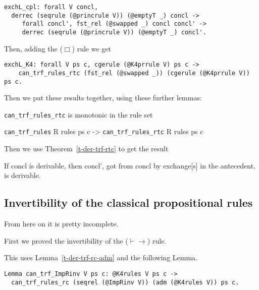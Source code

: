 \documentclass[a4paper,12pt]{llncs}
\begin{document}
\begin{verbatim}
exchL_cpl: forall V concl,
  derrec (seqrule (@princrule V)) (@emptyT _) concl ->
     forall concl', fst_rel (@swapped _) concl concl' ->
     derrec (seqrule (@princrule V)) (@emptyT _) concl'.
\end{verbatim}

Then, adding the ($\Box$) rule we get

\begin{verbatim}
exchL_K4: forall V ps c, cgerule (@K4prrule V) ps c ->
    can_trf_rules_rtc (fst_rel (@swapped _)) (cgerule (@K4prrule V)) ps c.
\end{verbatim}

Then we put these results together, using these further lemmas: 
\begin{lemma}\label{l-can-trf-rules-rtc}
\texttt{can\_trf\_rules\_rtc} is monotonic in the rule set
\end{lemma}
\begin{lemma}\label{l-can-trf-rules-imp-rtc}
\texttt{can\_trf\_rules} R rules ps c ->
  \texttt{can\_trf\_rules\_rtc} R rules ps c
\end{lemma}

Then we use Theorem~\ref{t-der-trf-rtc} to get the result

\begin{theorem}\label{t-exchL}
If concl is derivable, then concl', got from concl by exchange[s] in the
antecedent, is derivable.
\end{theorem}

\subsection{Invertibility of the classical propositional rules}

From here on it is pretty incomplete.

First we proved the invertibility of the ($\vdash\to$) rule.

This uses Lemma~\ref{t-der-trf-rc-adm} and the following Lemma.

\begin{lemma}\label{t-can-trf-ImpRinv}
\end{lemma}

\begin{verbatim}
Lemma can_trf_ImpRinv V ps c: @K4rules V ps c ->
  can_trf_rules_rc (seqrel (@ImpRinv V)) (adm (@K4rules V)) ps c.
\end{verbatim}
\end{document}
